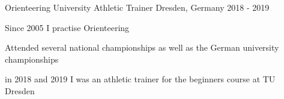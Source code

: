 \begin{cventries}
	\cventry
	{Orienteering} %
	{University Athletic Trainer} %
	{Dresden, Germany} %
	{2018 - 2019} %
	{
		\begin{cvitems} %
			\item{Since 2005 I practise Orienteering}
			\item{Attended several national championships as well as the German university championships}
			\item{in 2018 and 2019 I was an athletic trainer for the beginners course at TU Dresden}
		\end{cvitems}
	}

\end{cventries}
